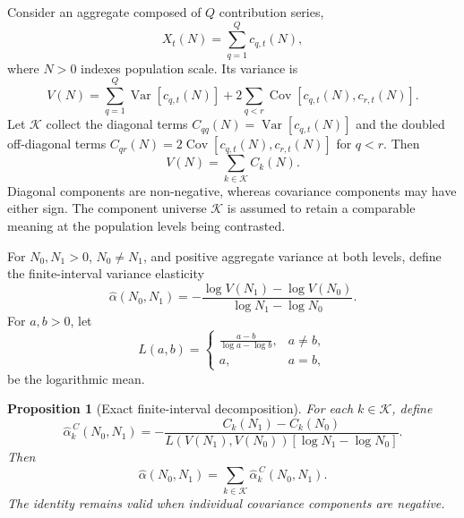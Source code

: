 \documentclass[preprint,12pt,authoryear]{elsarticle}
\newtheorem{proposition}{Proposition}
\begin{document}
Consider an aggregate composed of $Q$ contribution series,
\begin{equation}
    X_t(N)=\sum_{q=1}^{Q}c_{q,t}(N),
\end{equation}
where $N>0$ indexes population scale. Its variance is
\begin{equation}
\label{eq:variance_accounting}
    V(N)
    =
    \sum_{q=1}^{Q}\operatorname{Var}\!\left[c_{q,t}(N)\right]
    +
    2\sum_{q<r}\operatorname{Cov}\!\left[c_{q,t}(N),c_{r,t}(N)\right].
\end{equation}
Let $\mathcal{K}$ collect the diagonal terms
$C_{qq}(N)=\operatorname{Var}[c_{q,t}(N)]$ and the doubled off-diagonal
terms
$C_{qr}(N)=2\operatorname{Cov}[c_{q,t}(N),c_{r,t}(N)]$ for $q<r$. Then
\begin{equation}
\label{eq:component_sum}
    V(N)=\sum_{k\in\mathcal{K}}C_k(N).
\end{equation}
Diagonal components are non-negative, whereas covariance components may
have either sign. The component universe $\mathcal{K}$ is assumed to
retain a comparable meaning at the population levels being contrasted.

For $N_0,N_1>0$, $N_0\neq N_1$, and positive aggregate variance at both
levels, define the finite-interval variance elasticity
\begin{equation}
\label{eq:direct_alpha}
    \widehat{\alpha}(N_0,N_1)
    =
    -\frac{
        \log V(N_1)-\log V(N_0)
    }{
        \log N_1-\log N_0
    }.
\end{equation}
For $a,b>0$, let
\begin{equation}
\label{eq:log_mean}
    L(a,b)
    =
    \begin{cases}
        \displaystyle\frac{a-b}{\log a-\log b}, & a\neq b,\\[1em]
        a, & a=b,
    \end{cases}
\end{equation}
be the logarithmic mean.

\begin{proposition}[Exact finite-interval decomposition]
\label{prop:exact_decomposition}
For each $k\in\mathcal{K}$, define
\begin{equation}
\label{eq:component_alpha_contribution}
    \widehat{\alpha}^{\,C}_k(N_0,N_1)
    =
    -\frac{
        C_k(N_1)-C_k(N_0)
    }{
        L\!\left(V(N_1),V(N_0)\right)
        \left[\log N_1-\log N_0\right]
    }.
\end{equation}
Then
\begin{equation}
\label{eq:exact_alpha_decomposition}
    \widehat{\alpha}(N_0,N_1)
    =
    \sum_{k\in\mathcal{K}}
    \widehat{\alpha}^{\,C}_k(N_0,N_1).
\end{equation}
The identity remains valid when individual covariance components are
negative.
\end{proposition}
\end{document}
